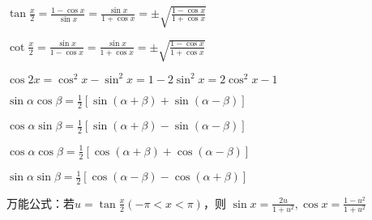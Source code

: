 \begin{spacing}{\hangju}
\begin{multicols}{2}
    \end{multicols}

    \noindent $\displaystyle \tan{ \frac{x}{2} } = \frac{ 1-\cos{x} }{ \sin{x} }=\frac{\sin{x}}{1+\cos{x}}=\pm\sqrt{\frac{1-\cos{x}}{1+\cos{x}}}$

    \noindent $\displaystyle \cot{\frac{x}{2}}=\frac{\sin{x}}{1-\cos{x}}=\frac{\sin{x}}{1+\cos{x}}=\pm\sqrt{\frac{1-\cos{x}}{1+\cos{x}}}$

    \noindent $\cos{2x}=\cos^2{x}-\sin^2{x}=1-2\sin^2{x}=2\cos^2{x}-1$

    \noindent $\sin{\alpha}\cos{\beta}=\frac{1}{2}[\sin{(\alpha+\beta)}+\sin{(\alpha-\beta)}]$

    \noindent $\cos{\alpha}\sin{\beta}=\frac{1}{2}[\sin{(\alpha+\beta)}-\sin{(\alpha-\beta)}]$

    \noindent $\cos{\alpha}\cos{\beta}=\frac{1}{2}[\cos{(\alpha+\beta)}+\cos{(\alpha-\beta)}]$

    \noindent $\sin{\alpha}\sin{\beta} =
        \frac{1}{2}[\cos{(\alpha-\beta)}-\cos{(\alpha+\beta)}]$

    \noindent 万能公式：若$u=\tan{\frac{x}{2}}(-\pi<x<\pi)$，则
        $\sin{x}=\frac{2u}{1+u^2}, \cos{x}=\frac{1-u^2}{1+u^2}$

\end{spacing}